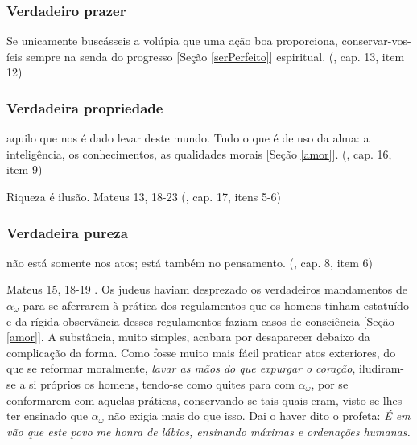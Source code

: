 \documentclass[12pt,a4paper]{article}
\begin{document}
			\subsubsection{Verdadeiro prazer}
			\begin{flushright}
			\end{flushright}

				Se unicamente busc\'asseis a vol\'upia que uma a\c{c}\~ao boa proporciona, conservar-vos-\'ieis sempre na senda do progresso [Se\c{c}\~ao \ref{serPerfeito}] espiritual. (\cite{ese}, cap. 13, item 12)

			\subsubsection{Verdadeira propriedade}
			\begin{flushright}
			\end{flushright}

				aquilo que nos \'e dado levar deste mundo. Tudo o que \'e de uso da alma: a intelig\^encia, os conhecimentos, as qualidades morais [Se\c{c}\~ao \ref{amor}]. (\cite{ese}, cap. 16, item 9)

  			Riqueza \'e ilus\~ao\cite{ilusao}. Mateus 13, 18-23 (\cite{ese}, cap. 17, itens 5-6)

			\subsubsection{Verdadeira pureza}
				\begin{flushright}
				\end{flushright}

				n\~ao est\'a somente nos atos; est\'a tamb\'em no pensamento. (\cite{ese}, cap. 8, item 6)

				Mateus 15, 18-19 \cite{palavras}.
				Os judeus haviam desprezado os verdadeiros mandamentos de $ \alpha_\omega $ para se aferrarem \`a pr\'atica dos regulamentos que os homens tinham estatu\'ido e da r\'igida observ\^ancia desses regulamentos faziam casos de consci\^encia [Se\c{c}\~ao \ref{amor}]. A subst\^ancia, muito simples, acabara por desaparecer debaixo da complica\c{c}\~ao da forma. Como fosse muito mais f\'acil praticar atos exteriores, do que se reformar moralmente, \emph{lavar as m\~aos do que expurgar o cora\c{c}\~ao}, iludiram-se a si pr\'oprios os homens, tendo-se como quites para com $ \alpha_\omega $, por se conformarem com aquelas pr\'aticas, conservando-se tais quais eram, visto se lhes ter ensinado que $ \alpha_\omega $ n\~ao exigia mais do que isso. Dai o haver dito o profeta: \emph{\'E em v\~ao que este povo me honra de l\'abios, ensinando m\'aximas e ordena\c{c}\~oes humanas.}
\end{document}

